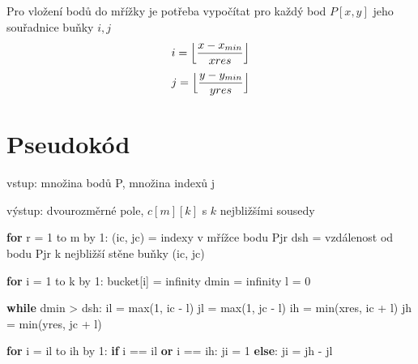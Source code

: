 \documentclass[
12pt,
a4paper,
pdftex,
czech,
titlepage
]{report}
\newenvironment{Shaded}{}{}
\newcommand{\BuiltInTok}[1]{#1}
\newcommand{\ControlFlowTok}[1]{\textcolor[rgb]{0.00,0.44,0.13}{\textbf{#1}}}
\newcommand{\DecValTok}[1]{\textcolor[rgb]{0.25,0.63,0.44}{#1}}
\newcommand{\KeywordTok}[1]{\textcolor[rgb]{0.00,0.44,0.13}{\textbf{#1}}}
\newcommand{\NormalTok}[1]{#1}
\newcommand{\OperatorTok}[1]{\textcolor[rgb]{0.40,0.40,0.40}{#1}}
\begin{document}
Pro vložení bodů do mřížky je potřeba vypočítat pro každý bod
\(P[x, y]\) jeho souřadnice buňky \(i, j\)
\[i = \Bigl\lfloor{\frac{x - x_{min}}{xres}} \Bigr\rfloor\]
\[j = \Bigl\lfloor{\frac{y - y_{min}}{yres}} \Bigr\rfloor\]

\hypertarget{pseudokuxf3d}{%
\chapter{Pseudokód}\label{pseudokuxf3d}}

vstup: množina bodů P, množina indexů j

výstup: dvourozměrné pole, \(c[m][k]\) s \(k\) nejbližšími sousedy

\begin{Shaded}
\begin{Highlighting}[]
\ControlFlowTok{for}\NormalTok{ r }\OperatorTok{=} \DecValTok{1}\NormalTok{ to m by }\DecValTok{1}\NormalTok{:}
\NormalTok{  (ic, jc) }\OperatorTok{=}\NormalTok{ indexy v mřížce bodu Pjr}
\NormalTok{  dsh }\OperatorTok{=}\NormalTok{ vzdálenost od bodu Pjr k nejbližší stěne buňky (ic, jc)}
    
  \ControlFlowTok{for}\NormalTok{ i }\OperatorTok{=} \DecValTok{1}\NormalTok{ to k by }\DecValTok{1}\NormalTok{:}
\NormalTok{    bucket[i] }\OperatorTok{=}\NormalTok{ infinity}
\NormalTok{  dmin }\OperatorTok{=}\NormalTok{ infinity}
\NormalTok{  l }\OperatorTok{=} \DecValTok{0}
        
  \ControlFlowTok{while}\NormalTok{ dmin }\OperatorTok{\textgreater{}}\NormalTok{ dsh:}
\NormalTok{    il }\OperatorTok{=} \BuiltInTok{max}\NormalTok{(}\DecValTok{1}\NormalTok{, ic }\OperatorTok{{-}} \NormalTok{l}\NormalTok{)}
\NormalTok{    jl }\OperatorTok{=} \BuiltInTok{max}\NormalTok{(}\DecValTok{1}\NormalTok{, jc }\OperatorTok{{-}}\NormalTok{ l)}
\NormalTok{    ih }\OperatorTok{=} \BuiltInTok{min}\NormalTok{(xres, ic }\OperatorTok{+} \NormalTok{l}\NormalTok{)}
\NormalTok{    jh }\OperatorTok{=} \BuiltInTok{min}\NormalTok{(yres, jc }\OperatorTok{+}\NormalTok{ l)}
            
    \ControlFlowTok{for}\NormalTok{ i }\OperatorTok{=}\NormalTok{ il to ih by }\DecValTok{1}\NormalTok{:}
      \ControlFlowTok{if}\NormalTok{ i }\OperatorTok{==}\NormalTok{ il }\KeywordTok{or}\NormalTok{ i }\OperatorTok{==}\NormalTok{ ih:}
\NormalTok{        ji }\OperatorTok{=} \DecValTok{1}
      \ControlFlowTok{else}\NormalTok{:}
\NormalTok{        ji }\OperatorTok{=}\NormalTok{ jh }\OperatorTok{{-}}\NormalTok{ jl}
                

\end{Highlighting}
\end{Shaded}
\end{document}
